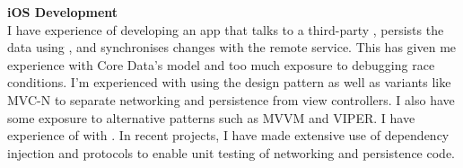 \textbf{iOS Development}\\
I have experience of developing an app that talks to a third-party
, persists the data using , and
synchronises changes with the remote service. This has given me experience with
Core Data's  model and too much exposure to debugging race
conditions. I'm experienced with using the  design pattern as well as
variants like MVC-N to separate networking and persistence from view
controllers. I also have some exposure to alternative patterns such as MVVM and
VIPER. I have experience of  with . In recent
projects, I have made extensive use of dependency injection and protocols to
enable unit testing of networking and persistence code.

